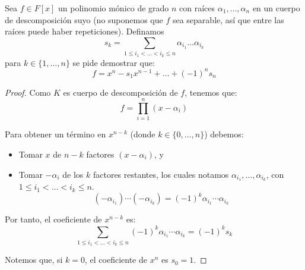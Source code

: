 \begin{ejercicio}\label{ej:cardano-vieta}
    Sea $f\in F[x]$ un polinomio mónico de grado $n$ con raíces $\alpha_1,\ldots,\alpha_n$ en un cuerpo de descomposición suyo (no suponemos que $f$ sea separable, así que entre las raíces puede haber repeticiones). Definamos
    \begin{equation*}
        s_k = \sum_{1\leq i_1 < \ldots < i_k \leq n} \alpha_{i_1} \dots \alpha_{i_k}
    \end{equation*}
    para $k \in \{1,\ldots,n\}$ se pide demostrar que:
    \begin{equation*}
        f = x^n - s_1x^{n-1} + \ldots + {(-1)}^{n}s_n
    \end{equation*}
    \begin{proof}
        Como $K$ es cuerpo de descomposición de $f$, tenemos que:
        \begin{equation*}
            f = \prod_{i=1}^{n}(x-\alpha_i)
        \end{equation*}

        Para obtener un término en $x^{n-k}$ (donde $k\in \{0,\ldots,n\}$) debemos:
        \begin{itemize}
            \item Tomar $x$ de $n-k$ factores $(x-\alpha_i)$, y
            \item Tomar $-\alpha_i$ de los $k$ factores restantes, los cuales notamos $\alpha_{i_1},\ldots,\alpha_{i_k}$, con $1\leq i_1 < \ldots < i_k \leq n$.
            \begin{equation*}
                (-\alpha_{i_1})\cdots(-\alpha_{i_k}) = {(-1)}^{k}\alpha_{i_1}\cdots\alpha_{i_k}
            \end{equation*}
        \end{itemize}

        Por tanto, el coeficiente de $x^{n-k}$ es:
        \begin{equation*}
            \sum_{1\leq i_1 < \ldots < i_k \leq n} {(-1)}^{k}\alpha_{i_1}\cdots\alpha_{i_k} = {(-1)}^{k}s_k
        \end{equation*}

        Notemos que, si $k=0$, el coeficiente de $x^n$ es $s_0 = 1$. 
    \end{proof}
\end{ejercicio}


